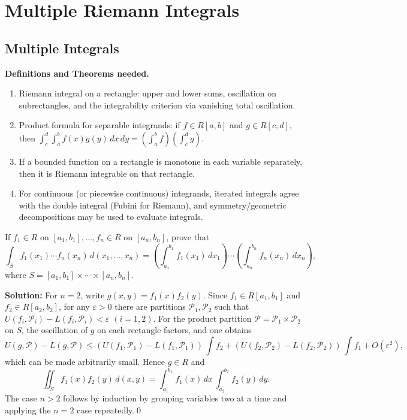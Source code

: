 \chapter{Multiple Riemann Integrals}
\section{Multiple Integrals}
\noindent\textbf{Definitions and Theorems needed.}
\begin{enumerate}[label=(\roman*)]
    \item Riemann integral on a rectangle: upper and lower sums, oscillation on subrectangles, and the integrability criterion via vanishing total oscillation.
    \item Product formula for separable integrands: if $f \in R[a,b]$ and $g \in R[c,d]$, then $\int_c^d \! \int_a^b f(x)g(y)\,dx\,dy = \left(\int_a^b f\right)\!\left(\int_c^d g\right)$.
    \item If a bounded function on a rectangle is monotone in each variable separately, then it is Riemann integrable on that rectangle.
    \item For continuous (or piecewise continuous) integrands, iterated integrals agree with the double integral (Fubini for Riemann), and symmetry/geometric decompositions may be used to evaluate integrals.
\end{enumerate}



\begin{problembox}
If \( f_1 \in R \) on \([a_1, b_1], \ldots, f_n \in R \) on \([a_n, b_n]\), prove that
\[ \int_{S} f_1(x_1) \cdots f_n(x_n) \, d(x_1, \ldots, x_n) = \left( \int_{a_1}^{b_1} f_1(x_1) \, dx_1 \right) \cdots \left( \int_{a_n}^{b_n} f_n(x_n) \, dx_n \right), \]
where \( S = [a_1, b_1] \times \cdots \times [a_n, b_n] \).
\end{problembox}

\bigskip\noindent\textbf{Solution:}
For $n=2$, write $g(x,y)=f_1(x)f_2(y)$. Since $f_1\in R[a_1,b_1]$ and $f_2\in R[a_2,b_2]$, for any $\varepsilon>0$ there are partitions $\mathcal P_1,\mathcal P_2$ such that $U(f_i,\mathcal P_i)-L(f_i,\mathcal P_i)<\varepsilon$ $(i=1,2)$. For the product partition $\mathcal P=\mathcal P_1\times\mathcal P_2$ on $S$, the oscillation of $g$ on each rectangle factors, and one obtains
\[ U(g,\mathcal P)-L(g,\mathcal P) \le (U(f_1,\mathcal P_1)-L(f_1,\mathcal P_1))\,\int f_2 + (U(f_2,\mathcal P_2)-L(f_2,\mathcal P_2))\,\int f_1 + O(\varepsilon^2), \]
which can be made arbitrarily small. Hence $g\in R$ and
\[ \iint_S f_1(x)f_2(y)\,d(x,y) = \int_{a_1}^{b_1} f_1(x)\,dx\,\int_{a_2}^{b_2} f_2(y)\,dy. \]
The case $n>2$ follows by induction by grouping variables two at a time and applying the $n=2$ case repeatedly.\qed


